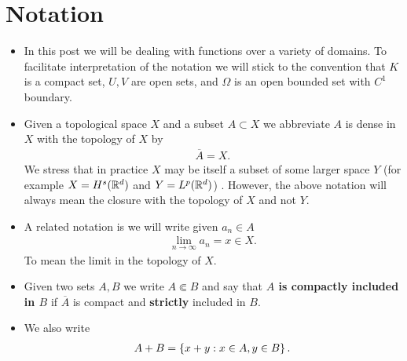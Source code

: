 \documentclass[12pt]{article}
\theoremstyle{remark}
\begin{document}
\section{Notation}
\begin{itemize}
	\item     In this post we will be dealing with functions over a variety of domains. To facilitate interpretation of the notation we will stick to the convention that $K$ is a compact set, $U, V$ are open sets, and $\Omega$ is an open bounded set with $C^1$ boundary.
	\item Given a topological space $X$ and a subset  $A \subset X$ we abbreviate $A$ is dense in  $X$ with the topology of  $X$ by
	      \begin{align*}
		      \overline{A}=X.
	      \end{align*}
	      We stress that in practice $X$ may be itself a subset of some larger space  $Y$ (for example $X= H^s(\mathbb{R}^d)$ and $ Y= L^p(\mathbb{R}^d)$) . However, the above notation will always mean the closure with the topology of  $X$ and not  $Y$.
	\item A related notation is we will write given $a_n \in  A$
	      \begin{align*}
		      \lim_{n \to \infty}a_n =x \in X.
	      \end{align*}
	      To mean the limit in the topology of $X$.

	\item     Given two sets $A,B$ we write  $A \Subset B$ and say that \textbf{$A$ is compactly included in  $B$} if $\overline{A}$ is compact and \textbf{strictly} included in $B$.
	\item We also write
	      \begin{align*}
		      A+B=\left\{x+y:x \in A, y \in  B\right\} .
	      \end{align*}


\end{itemize}
\end{document}
